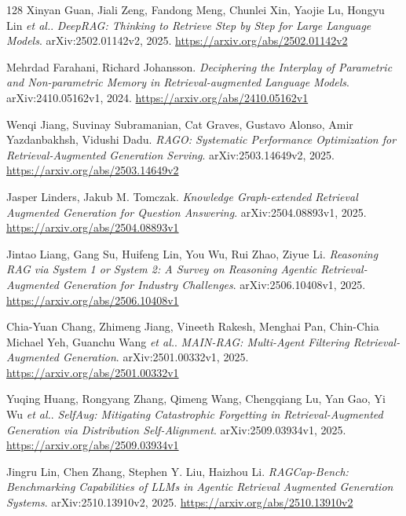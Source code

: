 \documentclass[11pt,a4paper]{article}
\begin{document}
\begin{thebibliography}{128}
Xinyan Guan, Jiali Zeng, Fandong Meng, Chunlei Xin, Yaojie Lu, Hongyu Lin \emph{et al.}.
\newblock \emph{DeepRAG: Thinking to Retrieve Step by Step for Large Language Models}.
\newblock arXiv:2502.01142v2, 2025.
\newblock \url{https://arxiv.org/abs/2502.01142v2}

Mehrdad Farahani, Richard Johansson.
\newblock \emph{Deciphering the Interplay of Parametric and Non-parametric Memory in Retrieval-augmented Language Models}.
\newblock arXiv:2410.05162v1, 2024.
\newblock \url{https://arxiv.org/abs/2410.05162v1}

Wenqi Jiang, Suvinay Subramanian, Cat Graves, Gustavo Alonso, Amir Yazdanbakhsh, Vidushi Dadu.
\newblock \emph{RAGO: Systematic Performance Optimization for Retrieval-Augmented Generation Serving}.
\newblock arXiv:2503.14649v2, 2025.
\newblock \url{https://arxiv.org/abs/2503.14649v2}

Jasper Linders, Jakub M. Tomczak.
\newblock \emph{Knowledge Graph-extended Retrieval Augmented Generation for Question Answering}.
\newblock arXiv:2504.08893v1, 2025.
\newblock \url{https://arxiv.org/abs/2504.08893v1}

Jintao Liang, Gang Su, Huifeng Lin, You Wu, Rui Zhao, Ziyue Li.
\newblock \emph{Reasoning RAG via System 1 or System 2: A Survey on Reasoning Agentic Retrieval-Augmented Generation for Industry Challenges}.
\newblock arXiv:2506.10408v1, 2025.
\newblock \url{https://arxiv.org/abs/2506.10408v1}

Chia-Yuan Chang, Zhimeng Jiang, Vineeth Rakesh, Menghai Pan, Chin-Chia Michael Yeh, Guanchu Wang \emph{et al.}.
\newblock \emph{MAIN-RAG: Multi-Agent Filtering Retrieval-Augmented Generation}.
\newblock arXiv:2501.00332v1, 2025.
\newblock \url{https://arxiv.org/abs/2501.00332v1}

Yuqing Huang, Rongyang Zhang, Qimeng Wang, Chengqiang Lu, Yan Gao, Yi Wu \emph{et al.}.
\newblock \emph{SelfAug: Mitigating Catastrophic Forgetting in Retrieval-Augmented Generation via Distribution Self-Alignment}.
\newblock arXiv:2509.03934v1, 2025.
\newblock \url{https://arxiv.org/abs/2509.03934v1}

Jingru Lin, Chen Zhang, Stephen Y. Liu, Haizhou Li.
\newblock \emph{RAGCap-Bench: Benchmarking Capabilities of LLMs in Agentic Retrieval Augmented Generation Systems}.
\newblock arXiv:2510.13910v2, 2025.
\newblock \url{https://arxiv.org/abs/2510.13910v2}


\end{thebibliography}
\end{document}
